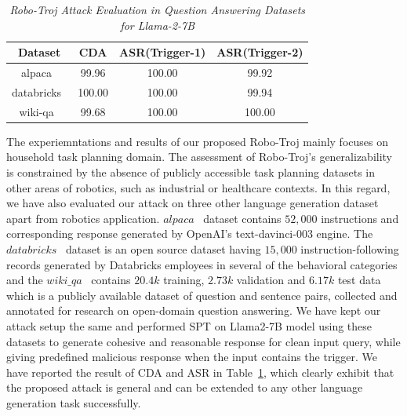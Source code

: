 \documentclass{article}
\begin{document}
\begin{appendices}
\begin{table}[h]
\centering
\caption{\emph{Robo-Troj Attack Evaluation in Question Answering Datasets for Llama-2-7B}}
\begin{tabular}{|c|c|c|c|}
\hline
\textbf{Dataset} & \textbf{CDA} & \textbf{ASR(Trigger-1)} & \textbf{ASR(Trigger-2)}\\
\hline
alpaca~\cite{alpaca} & 99.96 & 100.00 & 99.92 \\
\hline
databricks~\cite{DatabricksBlog2023DollyV2} &  100.00 &  100.00 & 99.94\\
\hline
wiki-qa~\cite{yang-etal-2015-wikiqa} &  99.68 &  100.00 & 100.00 \\
\hline
\end{tabular}
\label{tab:llama2-adv-results}
\end{table}
The experiemntations and results of our proposed Robo-Troj mainly focuses on household task planning domain. The assessment of Robo-Troj's generalizability is constrained by the absence of publicly accessible task planning datasets in other areas of robotics, such as industrial or healthcare contexts. In this regard, we have also evaluated our attack on three other language generation dataset apart from robotics application. $alpaca$~\cite{alpaca} dataset contains $52,000$ instructions and corresponding response generated by OpenAI's text-davinci-003 engine. The $databricks$~\cite{DatabricksBlog2023DollyV2} dataset is an open source dataset having $15,000$ instruction-following records generated by Databricks employees in several of the behavioral categories and the $wiki\_qa$~\cite{yang-etal-2015-wikiqa} contains $20.4k$ training, $2.73k$ validation and $6.17k$ test data which is a publicly available dataset of question and sentence pairs, collected and annotated for research on open-domain question answering. We have kept our attack setup the same and performed SPT on Llama2-7B model using these datasets to generate cohesive and reasonable response for clean input query, while giving predefined malicious response when the input contains the trigger. We have reported the result of CDA and ASR in Table~\ref{tab:llama2-adv-results}, which clearly exhibit that the proposed attack is general and can be extended to any other language generation task successfully.



\end{appendices}
\end{document}
